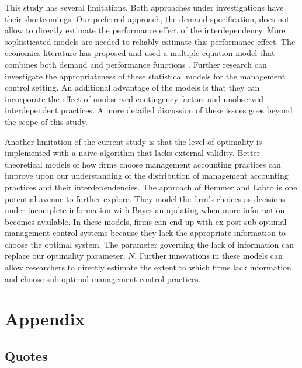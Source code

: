\documentclass[12pt]{article}
\begin{document}
This study has several limitations. Both approaches under investigations
have their shortcomings. Our preferred approach, the demand
specification, does not allow to directly estimate the performance
effect of the interdependency. More sophisticated models are needed to
reliably estimate this performance effect. The economics literature has
proposed and used a multiple equation model that combines both demand
and performance functions
\citep{Athey1998, Gentzkow2007, Kretschmer2012, Miravete2006}. Further
research can investigate the appropriateness of these statistical models
for the management control setting. An additional advantage of the
models is that they can incorporate the effect of unobserved contingency
factors and unobserved interdependent practices. A more detailed
discussion of these issues goes beyond the scope of this study.

Another limitation of the current study is that the level of optimality
is implemented with a naive algorithm that lacks external validity.
Better theoretical models of how firms choose management accounting
practices can improve upon our understanding of the distribution of
management accounting practices and their interdependencies. The
approach of Hemmer and Labro \citeyearpar{Hemmer2015} is one potential
avenue to further explore. They model the firm's choices as decisions
under incomplete information with Bayesian updating when more
information becomes available. In these models, firms can end up with
ex-post sub-optimal management control systems because they lack the
appropriate information to choose the optimal system. The parameter
governing the lack of information can replace our optimality parameter,
\(N\). Further innovations in these models can allow researchers to
directly estimate the extent to which firms lack information and choose
sub-optimal management control practices.

\pagebreak

\appendix
\renewcommand{\theequation}{A.\arabic{equation}}
\setcounter{equation}{0}

\section{Appendix}\label{appendix}

\subsection{Quotes}\label{correlation-interaction}
\end{document}
